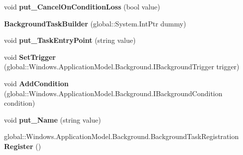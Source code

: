\begin{DoxyCompactItemize}
void {\bfseries put\+\_\+\+Cancel\+On\+Condition\+Loss} (bool value)
\item 
\mbox{\label{class_windows_1_1_application_model_1_1_background_1_1_background_task_builder_ab4df7612969c0e3657f25a103ae10fdb}} 
{\bfseries Background\+Task\+Builder} (global\+::\+System.\+Int\+Ptr dummy)
\item 
\mbox{\label{class_windows_1_1_application_model_1_1_background_1_1_background_task_builder_a35a57878e11b366a14d19cfe9b9168c9}} 
void {\bfseries put\+\_\+\+Task\+Entry\+Point} (string value)
\item 
\mbox{\label{class_windows_1_1_application_model_1_1_background_1_1_background_task_builder_ad3977b98abc7d118a48c9e6d131bc233}} 
void {\bfseries Set\+Trigger} (global\+::\+Windows.\+Application\+Model.\+Background.\+I\+Background\+Trigger trigger)
\item 
\mbox{\label{class_windows_1_1_application_model_1_1_background_1_1_background_task_builder_a9012601dbb13cc38b6863575770044f0}} 
void {\bfseries Add\+Condition} (global\+::\+Windows.\+Application\+Model.\+Background.\+I\+Background\+Condition condition)
\item 
\mbox{\label{class_windows_1_1_application_model_1_1_background_1_1_background_task_builder_a4250f9dec67adfee854b2884069c027b}} 
void {\bfseries put\+\_\+\+Name} (string value)
\item 
\mbox{\label{class_windows_1_1_application_model_1_1_background_1_1_background_task_builder_a97adeab2432933ca3bc4ee6e4852e5a0}} 
global\+::\+Windows.\+Application\+Model.\+Background.\+Background\+Task\+Registration {\bfseries Register} ()
\item 
\mbox{\label{class_windows_1_1_application_model_1_1_background_1_1_background_task_builder_a0739c66afd9bb62e0746d82fc02b1ca0}} 

\end{DoxyCompactItemize}
